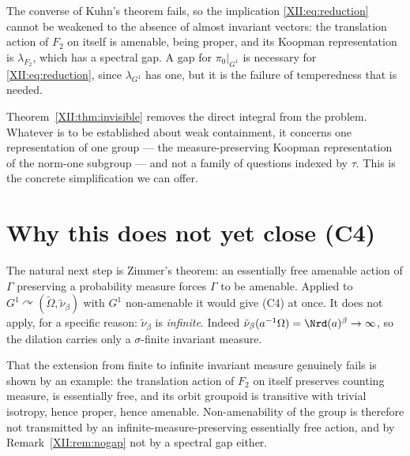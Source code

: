 \begin{remark}\label{XII:rem:nogap}
The converse of Kuhn's theorem fails, so the implication \eqref{XII:eq:reduction} cannot be
weakened to the absence of almost invariant vectors: the translation action of $F_2$ on itself
is amenable, being proper, and its Koopman representation is $\lambda_{F_2}$, which has a
spectral gap. A gap for $\pi_0|_{G^1}$ is necessary for \eqref{XII:eq:reduction}, since
$\lambda_{G^1}$ has one, but it is the failure of temperedness that is needed.
\end{remark}

\begin{remark}\label{XII:rem:onerep}
Theorem~\ref{XII:thm:invisible} removes the direct integral from the problem. Whatever is to be
established about weak containment, it concerns one representation of one group --- the
measure-preserving Koopman representation of the norm-one subgroup --- and not a family of
questions indexed by $\tau$. This is the concrete simplification we can offer.
\end{remark}

\section{Why this does not yet close (C4)}

\begin{remark}\label{XII:rem:zimmer}
The natural next step is Zimmer's theorem: an essentially free amenable action of $\Gamma$
preserving a probability measure forces $\Gamma$ to be amenable. Applied to
$G^1\curvearrowright(\widetilde\Omega,\tilde\nu_\beta)$ with $G^1$ non-amenable it would give
(C4) at once. It does not apply, for a specific reason: $\tilde\nu_\beta$ is
\emph{infinite}. Indeed $\tilde\nu_\beta(a^{-1}\Omega)=\Nrd(a)^{\beta}\to\infty$, so the
dilation carries only a $\sigma$-finite invariant measure.

That the extension from finite to infinite invariant measure genuinely fails is shown by an
example: the translation action of $F_2$ on itself preserves counting measure, is essentially
free, and its orbit groupoid is transitive with trivial isotropy, hence proper, hence
amenable. Non-amenability of the group is therefore not transmitted by an
infinite-measure-preserving essentially free action, and by Remark~\ref{XII:rem:nogap} not by a
spectral gap either.
\end{remark}

